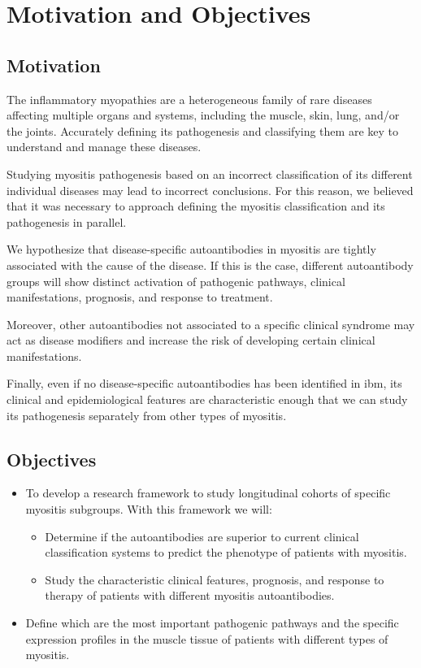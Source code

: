 \chapter{Motivation and Objectives}

\section{Motivation}
The inflammatory myopathies are a heterogeneous family of rare diseases affecting multiple organs and systems, including the muscle, skin, lung, and/or the joints. Accurately defining its pathogenesis and classifying them are key to understand and manage these diseases.

Studying myositis pathogenesis based on an incorrect classification of its different individual diseases may lead to incorrect conclusions. For this reason, we believed that it was necessary to approach defining the myositis classification and its pathogenesis in parallel.

We hypothesize that disease-specific autoantibodies in myositis are tightly associated with the cause of the disease. If this is the case, different autoantibody groups will show distinct activation of pathogenic pathways, clinical manifestations, prognosis, and response to treatment.

Moreover, other autoantibodies not associated to a specific clinical syndrome may act as disease modifiers and increase the risk of developing certain clinical manifestations.

Finally, even if no disease-specific autoantibodies has been identified in \gls{ibm}, its clinical and epidemiological features are characteristic enough that we can study its pathogenesis separately from other types of myositis.

\section{Objectives}
\begin{itemize}
	
	\item To develop a research framework to study longitudinal cohorts of specific myositis subgroups. With this framework we will:
	\begin{itemize}
		\item Determine if the autoantibodies are superior to current clinical classification systems to predict the phenotype of patients with myositis.
		\item Study the characteristic clinical features, prognosis, and response to therapy of patients with different myositis autoantibodies.
	\end{itemize}
	\item Define which are the most important pathogenic pathways and the specific expression profiles in the muscle tissue of patients with different types of myositis.
\end{itemize}

